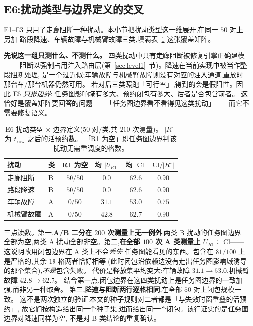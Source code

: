 \documentclass[manuscript,screen,review]{acmart}
\newcommand{\NPairs}{50}
\newcommand{\StrictlyLarger}{81/100}
\begin{document}
\subsection{E6:扰动类型与边界定义的交叉}
\label{sec:e6}

E1--E3 只用了走廊阻断一种扰动。本小节把扰动类型这一维展开,在同一 \(\NPairs\) 对上另加
路段降速、车辆故障与机械臂故障三类,填满表~\ref{tab:e6} 这张覆盖矩阵。

\textbf{先说这一组只测什么、不测什么。} 四类扰动中只有走廊阻断被修复引擎正确建模——
阻断以强制占用注入路由层(第~\ref{sec:level1}~节)。降速在当前实现中被当作整段阻断处理,
是一个过近似;车辆故障与机械臂故障则没有对应的注入通道,重放时那台车/那台机器仍然可用。
若对后三类照跑「可行率」,得到的会是假阳性。因此 E6 \emph{只报边界}:
任务图影响域有多大、预约闭包有多大、后者是否包含前者。
这恰好是覆盖矩阵要回答的问题——「任务图边界看不看得见这类扰动」——而它不需要修复语义。

\begin{table}[t]
\centering
\caption{E6 扰动类型 \(\times\) 边界定义(\(\NPairs\) 对/类,共 \(200\) 次测量)。
\(|R^{\circ}|\) 为 \(t_{\mathrm{now}}\) 之后的活预约数。
「R1 为空」即任务图边界判该扰动无需重调度的格数。}
\label{tab:e6}
\small
\begin{tabular}{@{}llcccc@{}}
\toprule
扰动 & 类 & R1 为空 & 均 \(|U_{R1}|\) & 均 \(|\mathrm{Cl}|\)
 & \(\mathrm{Cl}/|R^{\circ}|\) \\
\midrule
走廊阻断   & B & \(50/50\) & \(0.0\)  & \(62.6\) & \(0.90\) \\
路段降速   & B & \(50/50\) & \(0.0\)  & \(62.6\) & \(0.90\) \\
车辆故障   & A & \(0/50\)  & \(31.1\) & \(53.0\) & \(0.75\) \\
机械臂故障 & A & \(0/50\)  & \(42.8\) & \(62.7\) & \(0.90\) \\
\bottomrule
\end{tabular}
\end{table}

三点读数。第一,\textbf{A/B 二分在 \(200\) 次测量上无一例外}:两类 B 扰动的任务图边界
全部为空,两类 A 扰动全部非空。第二,\textbf{在全部 \(100\) 次 A 类测量上
\(U_{R1}\subseteq\mathrm{Cl}\)}——这说明改用闭包边界在 A 类上不会\emph{丢失}
任务图能看见的东西。包含在 \(\StrictlyLarger\) 上是严格的,其余 \(19\) 格两者恰好相等
(此时闭包沿依赖边没有走出任务图影响域诱导的那个集合),\emph{不是}包含失败。
代价是释放集平均变大:车辆故障 \(31.1\to 53.0\),机械臂故障 \(42.8\to 62.7\)。
结合第一点,闭包边界在这四类扰动上是任务图边界的一致加强,而非另一种取舍。
第三,\textbf{降速与阻断两行逐格相同},在全部 \(50\) 对上闭包规模一致。
这不是两次独立的验证:本文的种子规则对二者都是「与失效时窗重叠的活预约」,
故它们按构造给出同一个种子集,进而给出同一个闭包。该行证实的是任务图边界对降速同样为空,
不是对 B 类结论的重复确认。
\end{document}
